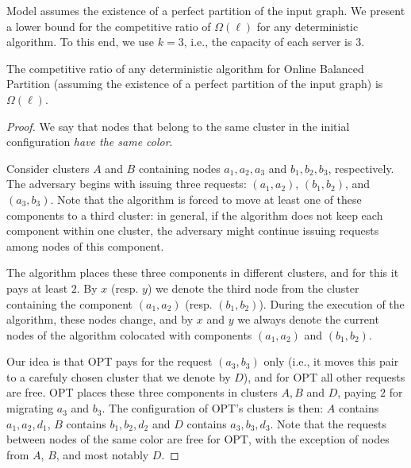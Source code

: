 Model assumes the existence of a perfect partition of the input graph.
We present a lower bound for the competitive ratio of $\Omega(\ell)$ for any deterministic algorithm.
To this end, we use $k = 3$, i.e., the capacity of each server is $3$.


\begin{theorem}
  The competitive ratio of any deterministic algorithm for Online Balanced Partition (assuming the existence of a perfect partition of the input graph) is $\Omega(\ell)$.
  \label{th:lb_omega_l}
\end{theorem}

\begin{proof}
We say that nodes that belong to the same cluster in the initial configuration \emph{have the same color}.

Consider clusters $A$ and $B$ containing nodes $a_1, a_2, a_3$ and $b_1, b_2, b_3$, respectively.
The adversary begins with issuing three requests: $(a_1, a_2)$, $(b_1, b_2)$, and $(a_3, b_3)$.
Note that the algorithm is forced to move at least one of these components to a third cluster:
in general, if the algorithm does not keep each component within one cluster, the adversary might continue issuing requests among nodes of this component.



The algorithm places these three components in different clusters, and for this it pays at least $2$.
By $x$ (resp. $y$) we denote the third node from the cluster containing the component $(a_1, a_2)$ (resp. $(b_1, b_2)$).
During the execution of the algorithm, these nodes change, and by $x$ and $y$ we always denote the current nodes of the algorithm colocated with components $(a_1, a_2)$ and $(b_1, b_2)$.


Our idea is that OPT pays for the request $(a_3, b_3)$ only (i.e., it moves this pair to a carefuly chosen cluster that we denote by $D$), and for OPT all other requests are free. 
OPT places these three components in clusters $A, B$ and $D$, paying $2$ for migrating $a_3$ and $b_3$.
The configuration of OPT's clusters is then: $A$ contains $a_1, a_2,d_1$, $B$ contains $b_1, b_2,d_2$ and $D$ contains $a_3, b_3, d_3$.
Note that the requests between nodes of the same color are free for OPT, with the exception of nodes from $A$, $B$, and most notably $D$.


\end{proof}
